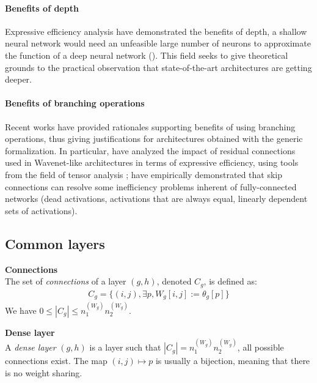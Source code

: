 \paragraph{Benefits of depth}
Expressive efficiency analysis have demonstrated the benefits of depth, \ie a shallow neural network would need an unfeasible large number of neurons to approximate the function of a deep neural network (\eg \cite{delalleau2011shallow,bianchini2014complexity,poggio2015theory,eldan2016power,poole2016exponential,raghu2016expressive,cohen2016convolutional,mhaskar2016learning,lin2017does,arora2018understanding}). This field seeks to give theoretical grounds to the practical observation that state-of-the-art architectures are getting deeper. 

\paragraph{Benefits of branching operations}
Recent works have provided rationales supporting benefits of using branching operations, thus giving justifications for architectures obtained with the generic formalization. In particular, \citep{cohen2018boosting} have analyzed the impact of residual connections used in Wavenet-like architectures \citep{van2016wavenet} in terms of expressive efficiency, using tools from the field of tensor analysis ; \citep{orhan2018skip} have empirically demonstrated that skip connections can resolve some inefficiency problems inherent of fully-connected networks (dead activations, activations that are always equal, linearly dependent sets of activations).


\subsection{Common layers}

\begin{definition}\textbf{Connections}\\
The set of \emph{connections} of a layer $(g,h)$, denoted $C_g$, is defined as:
\begin{gather*}
  C_g = \{(i,j), \exists p, W_g[i,j] := \theta_g[p]\}
\end{gather*}
We have $0 \leq |C_g| \leq n_1^{(W_g)} n_2^{(W_g)}$.
\end{definition}

\begin{definition}\textbf{Dense layer}\\
A \emph{dense layer} $(g,h)$ is a layer such that $|C_g| = n_1^{(W_g)} n_2^{(W_g)}$, \ie all possible connections exist. The map $(i,j) \mapsto p$ is usually a bijection, meaning that there is no weight sharing.
\end{definition}

